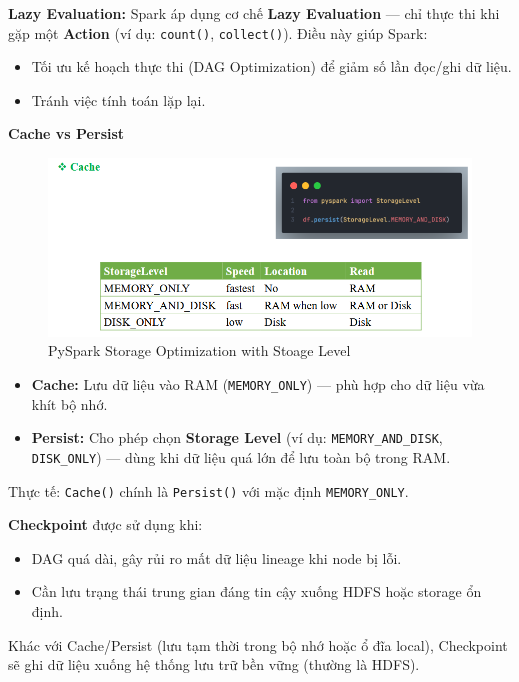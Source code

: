 \documentclass[11pt]{article}
\begin{document}
\textbf{Lazy Evaluation:}
Spark áp dụng cơ chế \textbf{Lazy Evaluation} — chỉ thực thi khi gặp một \textbf{Action} (ví dụ: \texttt{count()}, \texttt{collect()}). Điều này giúp Spark:
\begin{itemize}
    \item Tối ưu kế hoạch thực thi (DAG Optimization) để giảm số lần đọc/ghi dữ liệu.
    \item Tránh việc tính toán lặp lại.
\end{itemize}

\textbf{Cache vs Persist}
\begin{figure}[H]
    \centering
    \includegraphics[width=0.7\linewidth]{images/spark_StorageLevel.png}
    \caption{PySpark Storage Optimization with Stoage Level}
\end{figure}


\begin{itemize}
    \item \textbf{Cache:} Lưu dữ liệu vào RAM (\texttt{MEMORY\_ONLY}) — phù hợp cho dữ liệu vừa khít bộ nhớ.
    \item \textbf{Persist:} Cho phép chọn \textbf{Storage Level} (ví dụ: \texttt{MEMORY\_AND\_DISK}, \texttt{DISK\_ONLY}) — dùng khi dữ liệu quá lớn để lưu toàn bộ trong RAM.
\end{itemize}
\noindent
Thực tế: \texttt{Cache()} chính là \texttt{Persist()} với mặc định \texttt{MEMORY\_ONLY}.


\textbf{Checkpoint} được sử dụng khi:
\begin{itemize}
    \item DAG quá dài, gây rủi ro mất dữ liệu lineage khi node bị lỗi.
    \item Cần lưu trạng thái trung gian đáng tin cậy xuống HDFS hoặc storage ổn định.
\end{itemize}
Khác với Cache/Persist (lưu tạm thời trong bộ nhớ hoặc ổ đĩa local), Checkpoint sẽ ghi dữ liệu xuống hệ thống lưu trữ bền vững (thường là HDFS).
\end{document}
